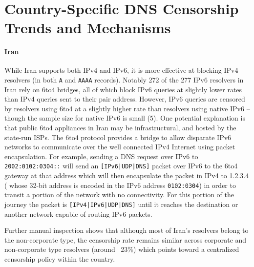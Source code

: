 \section{Country-Specific DNS Censorship Trends and Mechanisms}
\label{sec:cases}



\paragraph{Iran}
While Iran supports both IPv4 and IPv6, it is more effective at blocking IPv4
resolvers (in both \texttt{A} and \texttt{AAAA} records).
Notably 272 of the 277 IPv6 resolvers in Iran rely on 6to4 bridges, all of which
block IPv6 queries at slightly lower rates than IPv4 queries sent to their pair address.
However, IPv6 queries are censored by resolvers using 6to4 at a slightly higher
rate than resolvers using native IPv6 -- though the
sample size for native IPv6 is small (5). One potential explanation is that
public 6to4 appliances in Iran may be infrastructural, and hosted by the state-run ISPs.
The 6to4 protocol provides a bridge to allow disparate IPv6 networks
to communicate over the well connected IPv4 Internet using packet encapsulation.
For example, sending a DNS request over IPv6 to \texttt{2002:0102:0304::} will
send an \texttt{[IPv6|UDP|DNS]} packet over IPv6 to the 6to4 gateway at that address
which will then encapsulate the packet in IPv4 to 1.2.3.4 (
    whose 32-bit address is encoded in the IPv6 address \texttt{0102:0304}) in order to transit a portion of the
network with no connectivity. For this portion of the journey the packet is
\texttt{[IPv4|IPv6|UDP|DNS]} until it reaches the destination or another
network capable of routing IPv6 packets.

Further manual inspection shows that although most of Iran's resolvers belong
to the non-corporate type, the censorship rate remains similar across
corporate and non-corporate type resolvers (around ~23\%) which points toward a
centralized censorship policy within the country.


